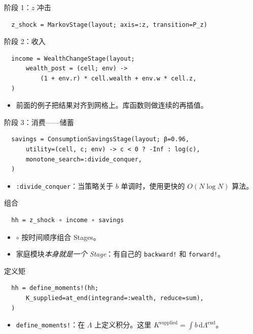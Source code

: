 \documentclass[10pt,aspectratio=169]{beamer}
\begin{document}
\begin{frame}[fragile]{阶段 1：$z$ 冲击}
  \begin{lstlisting}
  z_shock = MarkovStage(layout; axis=:z, transition=P_z)
  \end{lstlisting}
\end{frame}

\begin{frame}[fragile]{阶段 2：收入}
  \begin{lstlisting}
  income = WealthChangeStage(layout;
      wealth_post = (cell; env) ->
          (1 + env.r) * cell.wealth + env.w * cell.z,
  )
  \end{lstlisting}
  \begin{itemize}
    \item 前面的例子把结果对齐到网格上。库函数则做连续的再插值。
  \end{itemize}
\end{frame}

\begin{frame}[fragile]{阶段 3：消费——储蓄}
  \begin{lstlisting}
  savings = ConsumptionSavingsStage(layout; β=0.96,
      utility=(cell, c; env) -> c < 0 ? -Inf : log(c),
      monotone_search=:divide_conquer,
  )
  \end{lstlisting}
  \begin{itemize}
    \item \texttt{:divide\_conquer}：当策略关于 $b$ 单调时，使用更快的 $O(N \log N)$ 算法。
  \end{itemize}
\end{frame}

\begin{frame}[fragile]{组合}
  \begin{lstlisting}
  hh = z_shock ∘ income ∘ savings
  \end{lstlisting}
  \begin{itemize}
    \item \texttt{$\circ$} 按时间顺序组合 Stages。
    \item 家庭模块\emph{本身就是一个 Stage}：有自己的 \texttt{backward!} 和 \texttt{forward!}。
  \end{itemize}
\end{frame}

\begin{frame}[fragile]{定义矩}
  \begin{lstlisting}
  hh = define_moments!(hh;
      K_supplied=at_end(integrand=:wealth, reduce=sum),
  )
  \end{lstlisting}
  \begin{itemize}
    \item \texttt{define\_moments!}：在 $\Lambda$ 上定义积分。这里 $K^{\mathrm{supplied}} = \int b\,\mathrm{d}\Lambda^\text{end}$。
  \end{itemize}
\end{frame}
\end{document}
